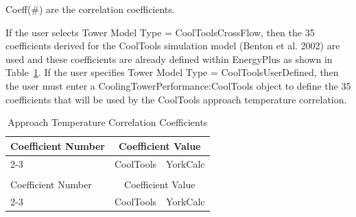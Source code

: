 Coeff(\#) are the correlation coefficients.

If the user selects Tower Model Type = CoolToolsCrossFlow, then the 35 coefficients derived for the CoolTools simulation model (Benton et al. 2002) are used and these coefficients are already defined within EnergyPlus as shown in Table~\ref{table:approach-temperature-correlation-coefficients}. If the user specifies Tower Model Type = CoolToolsUserDefined, then the user must enter a CoolingTowerPerformance:CoolTools object to define the 35 coefficients that will be used by the CoolTools approach temperature correlation.

\begin{longtable}[c]{p{2.0in}p{2.0in}p{2.0in}}

\caption{Approach Temperature Correlation Coefficients \label{table:approach-temperature-correlation-coefficients}} \tabularnewline
\toprule
Coefficient Number & \multicolumn{2}{c}{Coefficient Value} \tabularnewline
\cmidrule(r){2-3}
& CoolTools & YorkCalc \tabularnewline
\midrule
\endfirsthead

\caption[]{Approach Temperature Correlation Coefficients} \tabularnewline
\toprule
Coefficient Number & \multicolumn{2}{c}{Coefficient Value} \tabularnewline
\cmidrule(r){2-3}
& CoolTools & YorkCalc \tabularnewline
\midrule
\endhead


\end{longtable}
